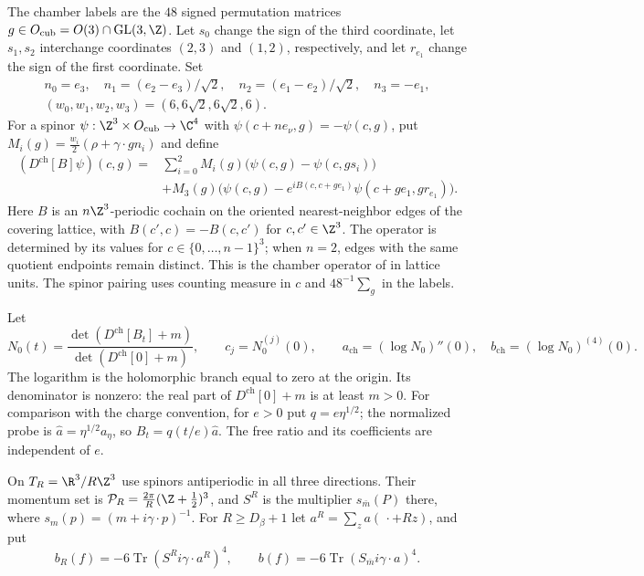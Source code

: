 \documentclass[11pt,letterpaper,reqno]{amsart}
\begin{document}
The chamber labels are the $48$ signed permutation matrices
$g\in O_{\mathrm{cub}}=O(3)\cap\operatorname{GL}(3,\Z)$.
Let $s_0$ change the sign of the third coordinate, let $s_1,s_2$
interchange coordinates $(2,3)$ and $(1,2)$, respectively, and let
$r_{e_1}$ change the sign of the first coordinate. Set
\begin{gather*}
 n_0=e_3,\quad n_1=(e_2-e_3)/\sqrt2,\quad
 n_2=(e_1-e_2)/\sqrt2,\quad n_3=-e_1,\\
 (w_0,w_1,w_2,w_3)=(6,6\sqrt2,6\sqrt2,6).
\end{gather*}
For a spinor $\psi:\Z^3\times O_{\mathrm{cub}}\to\C^4$ with
$\psi(c+ne_\nu,g)=-\psi(c,g)$, put
$M_i(g)=\frac{w_i}{2}(\rho+\gamma\cdot gn_i)$ and define
\begin{equation}\label{eq:prm-chamber-operator}
\begin{split}
 (D^{\mathrm{ch}}[B]\psi)(c,g)
 ={}&\sum_{i=0}^2M_i(g)\bigl(\psi(c,g)-\psi(c,gs_i)\bigr)\\
 &+M_3(g)\bigl(\psi(c,g)
       -e^{iB(c,c+ge_1)}\psi(c+ge_1,gr_{e_1})\bigr).
\end{split}
\end{equation}
Here $B$ is an $n\Z^3$-periodic cochain on the oriented nearest-neighbor
edges of the covering lattice, with $B(c',c)=-B(c,c')$ for
$c,c'\in\Z^3$. The operator is determined by its values for
$c\in\{0,\ldots,n-1\}^3$; when $n=2$, edges with the same quotient
endpoints remain distinct. This is the chamber operator
of \cite[\S2]{ChamberLattice} in lattice units.
The spinor pairing uses counting measure in $c$ and
$48^{-1}\sum_g$ in the labels.

Let
\begin{equation}\label{eq:response-free-ratio}
 N_0(t)=\frac{\det(D^{\mathrm{ch}}[B_t]+m)}
                  {\det(D^{\mathrm{ch}}[0]+m)},\qquad
 c_j=N_0^{(j)}(0),\qquad
 a_{\mathrm{ch}}=(\log N_0)''(0),\quad
 b_{\mathrm{ch}}=(\log N_0)^{(4)}(0).
\end{equation}
The logarithm is the holomorphic branch equal to zero at the
origin. Its denominator is nonzero: the real part of
$D^{\mathrm{ch}}[0]+m$ is at least $m>0$. For comparison
with the charge convention, for $e>0$ put $q=e\eta^{1/2}$; the normalized
probe is $\widehat a=\eta^{1/2}a_\eta$, so
$B_t=q(t/e)\widehat a$. The free ratio and its coefficients
are independent of $e$.

On $T_R=\R^3/R\Z^3$ use spinors antiperiodic in all three directions.
Their momentum set is
$\mathcal P_R=\frac{2\pi}{R}(\Z+\frac12)^3$, and
$S^R$ is the multiplier $s_{\bar m}(P)$ there, where
$s_m(p)=(m+i\gamma\cdot p)^{-1}$. For
$R\ge D_\beta+1$ let $a^R=\sum_za(\,\cdot+Rz)$, and put
\begin{equation}\label{eq:response-continuum-fourth}
 b_R(f)=-6\operatorname{Tr}(S^Ri\gamma\cdot a^R)^4,
 \qquad b(f)=-6\operatorname{Tr}(S_{\bar m}i\gamma\cdot a)^4.
\end{equation}
\end{document}
